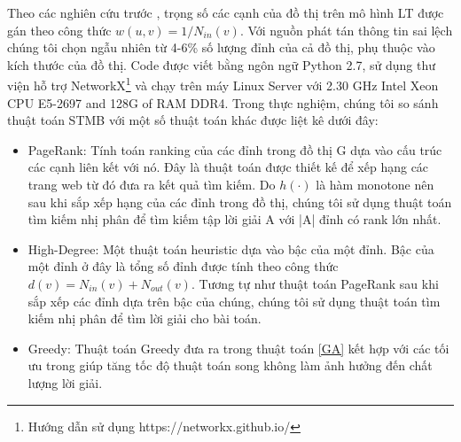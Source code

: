 Theo các nghiên cứu trước \cite{khali, kemple1,chen10LT}, trọng số các cạnh của đồ thị trên mô hình LT được gán theo công thức $w(u,v) = 1/N_{in}(v)$. Với nguồn phát tán thông tin sai lệch chúng tôi chọn ngẫu nhiên từ 4-6\% số lượng đỉnh của cả đồ thị, phụ thuộc vào kích thước của đồ thị. Code được viết bằng ngôn ngữ Python 2.7, sử dụng thư viện hỗ trợ NetworkX\footnote{Hướng dẫn sử dụng https://networkx.github.io/} và chạy trên máy Linux Server với 2.30 GHz Intel\textsuperscript{\textregistered} Xeon\textsuperscript{\textregistered} CPU E5-2697 and 128G of RAM DDR4. Trong thực nghiệm, chúng tôi so sánh thuật toán STMB với một số thuật toán khác được liệt kê dưới đây:
\begin {itemize}
\item PageRank: Tính toán ranking của các đỉnh trong đồ thị G dựa vào cấu trúc các cạnh liên kết với nó. Đây là thuật toán được thiết kế để xếp hạng các trang web từ đó đưa ra kết quả tìm kiếm. Do $h(\cdot)$ là hàm monotone nên sau khi sắp xếp hạng của các đỉnh trong đồ thị, chúng tôi sử dụng thuật toán tìm kiếm nhị phân để tìm kiếm tập lời giải A với |A| đỉnh có rank lớn nhất.
\item High-Degree: Một thuật toán heuristic dựa vào bậc của một đỉnh. Bậc của một đỉnh ở đây là tổng số đỉnh được tính theo công thức $d(v) = N_{in}(v) + N_{out}(v)$. Tương tự như thuật toán PageRank sau khi sắp xếp các đỉnh dựa trên bậc của chúng, chúng tôi sử dụng thuật toán tìm kiếm nhị phân để tìm lời giải cho bài toán.
\item Greedy: Thuật toán Greedy đưa ra trong thuật toán \ref{GA} kết hợp với các tối ưu trong \cite{Jleskovec} giúp tăng tốc độ thuật toán song không làm ảnh hưởng đến chất lượng lời giải.
\end{itemize} 

